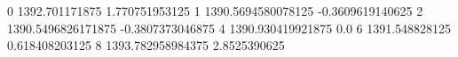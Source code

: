 0 1392.701171875 1.770751953125
1 1390.5694580078125 -0.3609619140625
2 1390.5496826171875 -0.3807373046875
4 1390.930419921875 0.0
6 1391.548828125 0.618408203125
8 1393.782958984375 2.8525390625
